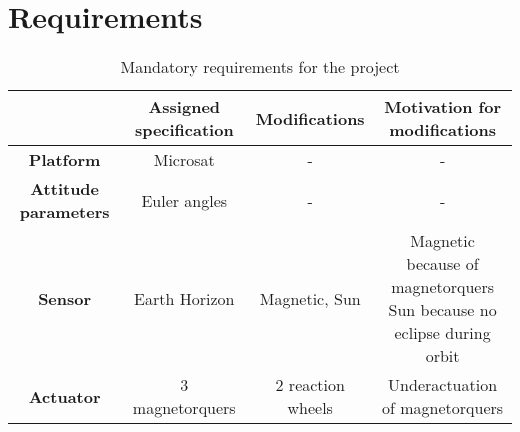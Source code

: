 \section{Requirements}
\label{sec:requirements}

\begin{table}[H]

    \centering
    \begin{tabular}{|c|c|c|c|}
    \hline
    & \textbf{Assigned specification} & \textbf{Modifications}  & \textbf{Motivation for modifications} \\
    \hline
    \textbf{Platform} & Microsat & - & - \\
    \hline
    \textbf{Attitude parameters} & Euler angles & - & - \\
    \hline
    \textbf{Sensor} & Earth Horizon & Magnetic, Sun &
    \makecell{Magnetic because of magnetorquers \\
    Sun because no eclipse during orbit} \\
    \hline
    \textbf{Actuator} & 3 magnetorquers & 2 reaction wheels &
    Underactuation of magnetorquers \\
    \hline
    \end{tabular}
    
    \caption{Mandatory requirements for the project}
    \label{table:requirements}
    
\end{table}